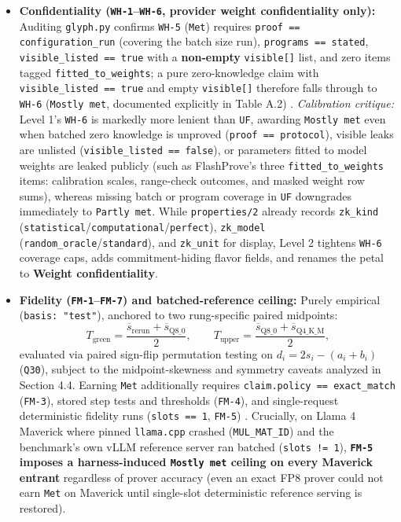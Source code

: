 \documentclass[11pt,letterpaper]{article}
\begin{document}
\begin{itemize}
\item \textbf{Confidentiality (\texttt{WH-1}--\texttt{WH-6}, provider weight confidentiality only):} Auditing \texttt{glyph.\allowbreak{}py} confirms \texttt{WH-5} (\texttt{Met}) requires \texttt{proof == configuration\_\allowbreak{}run} (covering the batch size run), \texttt{programs == stated}, \texttt{visible\_\allowbreak{}listed == true} with a \textbf{non-empty} \texttt{visible[]} list, and zero items tagged \texttt{fitted\_\allowbreak{}to\_\allowbreak{}weights}; a pure zero-knowledge claim with \texttt{visible\_\allowbreak{}listed == true} and empty \texttt{visible[]} therefore falls through to \texttt{WH-6} (\texttt{Mostly met}, documented explicitly in Table A.2) \cite{iproofs2026}. \textit{Calibration critique:} Level 1's \texttt{WH-6} is markedly more lenient than \texttt{UF}, awarding \texttt{Mostly met} even when batched zero knowledge is unproved (\texttt{proof == protocol}), visible leaks are unlisted (\texttt{visible\_\allowbreak{}listed == false}), or parameters fitted to model weights are leaked publicly (such as FlashProve's three \texttt{fitted\_\allowbreak{}to\_\allowbreak{}weights} items: calibration scales, range-check outcomes, and masked weight row sums), whereas missing batch or program coverage in \texttt{UF} downgrades immediately to \texttt{Partly met}. While \texttt{properties/\allowbreak{}2} already records \texttt{zk\_\allowbreak{}kind} (\texttt{statistical}/\texttt{computational}/\texttt{perfect}), \texttt{zk\_\allowbreak{}model} (\texttt{random\_\allowbreak{}oracle}/\texttt{standard}), and \texttt{zk\_\allowbreak{}unit} for display, Level 2 tightens \texttt{WH-6} coverage caps, adds commitment-hiding flavor fields, and renames the petal to \textbf{Weight confidentiality}.
\item \textbf{Fidelity (\texttt{FM-1}--\texttt{FM-7}) and batched-reference ceiling:} Purely empirical (\texttt{basis: "test"}), anchored to two rung-specific paired midpoints:
\[
T_{\text{green}} = \frac{\overline{s}_{\text{rerun}} + \overline{s}_{\text{Q8\_0}}}{2}, \qquad T_{\text{upper}} = \frac{\overline{s}_{\text{Q8\_0}} + \overline{s}_{\text{Q4\_K\_M}}}{2},
\] evaluated via paired sign-flip permutation testing on $d_i = 2 s_i - (a_i + b_i)$ (\texttt{Q30}), subject to the midpoint-skewness and symmetry caveats analyzed in Section 4.4. Earning \texttt{Met} additionally requires \texttt{claim.\allowbreak{}policy == exact\_\allowbreak{}match} (\texttt{FM-3}), stored step tests and thresholds (\texttt{FM-4}), and single-request deterministic fidelity runs (\texttt{slots == 1}, \texttt{FM-5}) \cite{iproofs2026}. Crucially, on Llama 4 Maverick where pinned \texttt{llama.\allowbreak{}cpp} crashed (\texttt{MUL\_\allowbreak{}MAT\_\allowbreak{}ID}) and the benchmark's own vLLM reference server ran batched (\texttt{slots != 1}), \textbf{\texttt{FM-5} imposes a harness-induced \texttt{Mostly met} ceiling on every Maverick entrant} regardless of prover accuracy (even an exact FP8 prover could not earn \texttt{Met} on Maverick until single-slot deterministic reference serving is restored).

\end{itemize}
\end{document}
